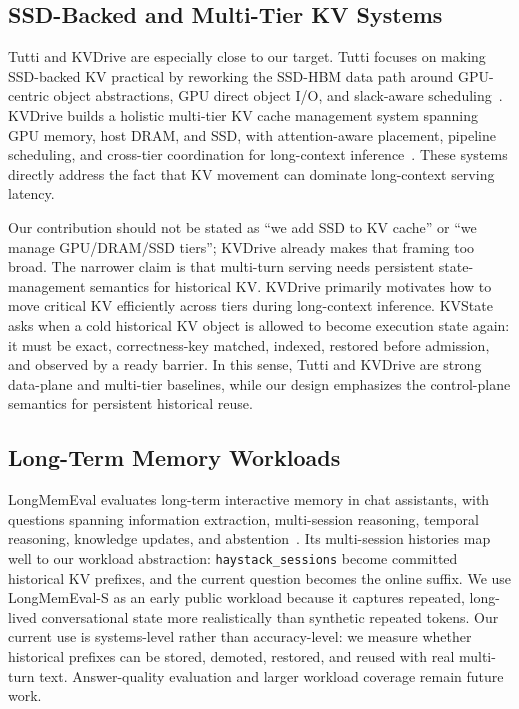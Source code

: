 \documentclass[sigconf,review,anonymous]{acmart}
\newcommand{\system}{KVState\xspace}
\begin{document}
\subsection{SSD-Backed and Multi-Tier KV Systems}

Tutti and KVDrive are especially close to our target. Tutti focuses on making
SSD-backed KV practical by reworking the SSD-HBM data path around GPU-centric
object abstractions, GPU direct object I/O, and slack-aware
scheduling~\citep{qiu2026tutti}. KVDrive builds a holistic multi-tier KV cache
management system spanning GPU memory, host DRAM, and SSD, with
attention-aware placement, pipeline scheduling, and cross-tier coordination for
long-context inference~\citep{lin2026kvdrive}. These systems directly address
the fact that KV movement can dominate long-context serving latency.

Our contribution should not be stated as ``we add SSD to KV cache'' or ``we
manage GPU/DRAM/SSD tiers''; KVDrive already makes that framing too broad. The
narrower claim is that multi-turn serving needs persistent state-management
semantics for historical KV. KVDrive primarily motivates how to move critical
KV efficiently across tiers during long-context inference. \system asks when a
cold historical KV object is allowed to become execution state again: it must
be exact, correctness-key matched, indexed, restored before admission, and
observed by a ready barrier. In this sense, Tutti and KVDrive are strong
data-plane and multi-tier baselines, while our design emphasizes the
control-plane semantics for persistent historical reuse.

\subsection{Long-Term Memory Workloads}

LongMemEval evaluates long-term interactive memory in chat assistants, with
questions spanning information extraction, multi-session reasoning, temporal
reasoning, knowledge updates, and abstention~\citep{wu2024longmemeval}. Its
multi-session histories map well to our workload abstraction:
\texttt{haystack\_sessions} become committed historical KV prefixes, and the
current question becomes the online suffix. We use LongMemEval-S as an early
public workload because it captures repeated, long-lived conversational state
more realistically than synthetic repeated tokens. Our current use is
systems-level rather than accuracy-level: we measure whether historical prefixes
can be stored, demoted, restored, and reused with real multi-turn text.
Answer-quality evaluation and larger workload coverage remain future work.
\end{document}
